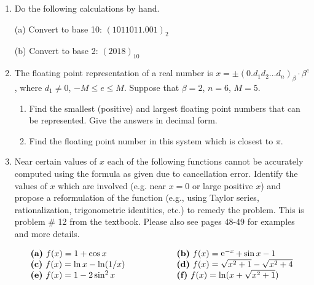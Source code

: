 \documentclass [12pt]{article}
\begin{document}
\begin{enumerate}

\item Do the following calculations by hand.

\smallskip
(a) Convert to base 10: $(1011011.001)_2$

\smallskip
(b) Convert to base 2: $(2018)_{10}$

\item The floating point representation of a real number is $x=\pm
(0.d_{1}d_{2}\ldots d_{n})_\beta\cdot \beta^e$, where
$d_{1}\not=0$, $-M\leq e\leq M$. Suppose that $\beta=2$, $n=6$,
$M=5$.

\begin{enumerate}

\item Find the smallest (positive) and largest floating point
numbers that can be represented. Give the answers in decimal form.

\item Find the floating point number in this system which is
closest to $\pi$.

\end{enumerate}

\item Near certain values of $x$ each of the following functions
cannot be accurately  computed using the formula as given due to
cancellation error. Identify the values of $x$ which are involved
(e.g. near $x=0$ or large positive $x$) and propose a
reformulation of the function (e.g., using Taylor series,
rationalization, trigonometric identities, etc.) to remedy the
problem. This is problem \# 12 from the textbook. Please also see pages 48-49 for examples and more details.

\[
\begin{array}{ll}
\mbox{\bf (a)} \ f(x)=1+\cos x & \hspace{50pt} \mbox{\bf (b)} \
f(x)=\e^{-x}+\sin x-1 \\
\mbox{\bf (c)} \ f(x)=\ln x-\ln(1/x) & \hspace{50pt} \mbox{\bf
(d)} \
f(x)=\sqrt{x^2+1}-\sqrt{x^2+4} \\
\mbox{\bf (e)} \ f(x)=1-2\sin^2x & \hspace{50pt} \mbox{\bf (f)} \
f(x)=\ln(x+\sqrt{x^2+1}) %
\end{array}
\]


\end{enumerate}
\end{document}
